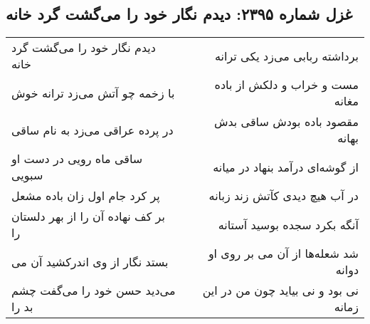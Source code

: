 \begin{center}
\section*{غزل شماره ۲۳۹۵: دیدم نگار خود را می‌گشت گرد خانه}
\label{sec:2395}
\begin{longtable}{l p{0.5cm} r}
دیدم نگار خود را می‌گشت گرد خانه
&&
برداشته ربابی می‌زد یکی ترانه
\\
با زخمه چو آتش می‌زد ترانه خوش
&&
مست و خراب و دلکش از باده مغانه
\\
در پرده عراقی می‌زد به نام ساقی
&&
مقصود باده بودش ساقی بدش بهانه
\\
ساقی ماه رویی در دست او سبویی
&&
از گوشه‌ای درآمد بنهاد در میانه
\\
پر کرد جام اول زان باده مشعل
&&
در آب هیچ دیدی کآتش زند زبانه
\\
بر کف نهاده آن را از بهر دلستان را
&&
آنگه بکرد سجده بوسید آستانه
\\
بستد نگار از وی اندرکشید آن می
&&
شد شعله‌ها از آن می بر روی او دوانه
\\
می‌دید حسن خود را می‌گفت چشم بد را
&&
نی بود و نی بیاید چون من در این زمانه
\\
\end{longtable}
\end{center}
